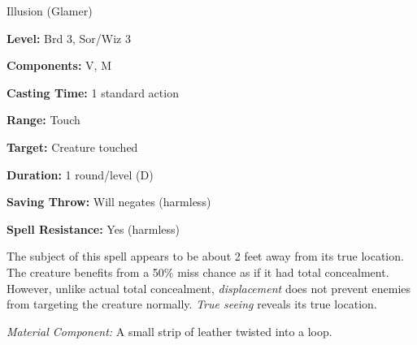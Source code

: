 
Illusion (Glamer)

\textbf{Level:} Brd 3, Sor/Wiz 3

\textbf{Components:} V, M

\textbf{Casting Time:} 1 standard action

\textbf{Range:} Touch

\textbf{Target:} Creature touched

\textbf{Duration:} 1 round/level (D)

\textbf{Saving Throw:} Will negates (harmless)

\textbf{Spell Resistance:} Yes (harmless)

The subject of this spell appears to be about 2 feet away from its true location. 
The creature benefits from a 50\% miss chance as if it had total concealment. However, 
unlike actual total concealment, \textit{displacement} does not prevent enemies 
from targeting the creature normally. \textit{True seeing} reveals its true location.

\textit{Material Component:} A small strip of leather twisted into a loop.

